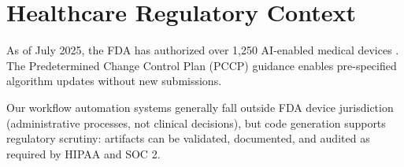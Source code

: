 \documentclass[11pt]{article}
\begin{document}
\section{Healthcare Regulatory Context}
\label{app:regulatory}

As of July 2025, the FDA has authorized over 1,250 AI-enabled medical devices \citep{fda2025}. The Predetermined Change Control Plan (PCCP) guidance enables pre-specified algorithm updates without new submissions.

Our workflow automation systems generally fall outside FDA device jurisdiction (administrative processes, not clinical decisions), but code generation supports regulatory scrutiny: artifacts can be validated, documented, and audited as required by HIPAA and SOC 2.
\end{document}
